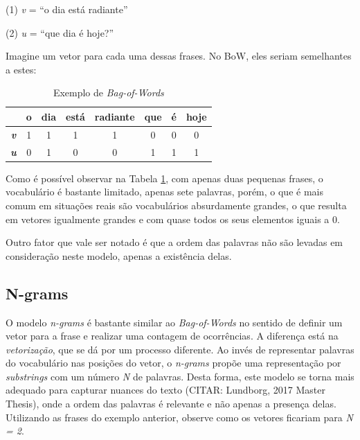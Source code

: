 \begin{samepage}
(1) \textit{v} =  “o dia está radiante”

\nopagebreak

(2) \textit{u} = “que dia é hoje?”
\end{samepage}

Imagine um vetor para cada uma dessas frases. No BoW, eles seriam semelhantes a estes:

\begin{center}
\begin{table}[htbp]
\centering
\begin{tabular}{cccccccc}
 & \textbf{o} & \textbf{dia} & \textbf{está} & \textbf{radiante} & \textbf{que} & \textbf{é} & \textbf{hoje} \\ \hline
\textbf{\textit{v}} & 1 & 1 & 1 & 1 & 0 & 0 & 0 \\
\textbf{\textit{u}} & 0 & 1 & 0 & 0 & 1 & 1 & 1 
\end{tabular}
\caption{Exemplo de \textit{Bag-of-Words}}
\label{bow}
\end{table}
\end{center}

Como é possível observar na Tabela \ref{bow}, com apenas duas pequenas frases, o vocabulário é bastante limitado, apenas sete palavras, porém, o que é mais comum em situações reais são vocabulários absurdamente grandes, o que resulta em vetores igualmente grandes e com quase todos os seus elementos iguais a 0.

Outro fator que vale ser notado é que a ordem das palavras não são levadas em consideração neste modelo, apenas a existência delas.

\subsection{N-grams}

O modelo \textit{n-grams} é bastante similar ao \textit{Bag-of-Words} no sentido de definir um vetor para a frase e realizar uma contagem de ocorrências. A diferença está na \textit{vetorização}, que se dá por um processo diferente. Ao invés de representar palavras do vocabulário nas posições do vetor, o \textit{n-grams} propõe uma representação por \textit{substrings}  com um número \textit{N} de palavras. Desta forma, este modelo se torna mais adequado para capturar nuances do texto (CITAR: Lundborg, 2017 Master Thesis), onde a ordem das palavras é relevante e não apenas a presença delas. Utilizando as frases do exemplo anterior, observe como os vetores ficariam para \textit{N = 2}.

